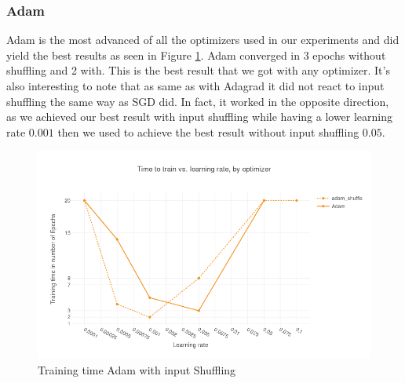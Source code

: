 \subsubsection{Adam}
Adam is the most advanced of all the optimizers used in our experiments and did yield the best results as seen in Figure \ref{fig:results_adam_shuffle}. Adam converged in 3 epochs without shuffling and 2 with. This is the best result that we got with any optimizer.  It's also interesting to note that as same as with Adagrad it did not react to input shuffling the same way as SGD did. In fact, it worked in the opposite direction, as we achieved our best result with input shuffling while having a lower learning rate $0.001$ then we used to achieve the best result without input shuffling $0.05$.
\begin{figure}[h]
    \centering
            \includegraphics[scale=0.3]{images/results_adam_shuffle} 
    \caption{Training time Adam with input Shuffling}
    \label{fig:results_adam_shuffle}
\end{figure}